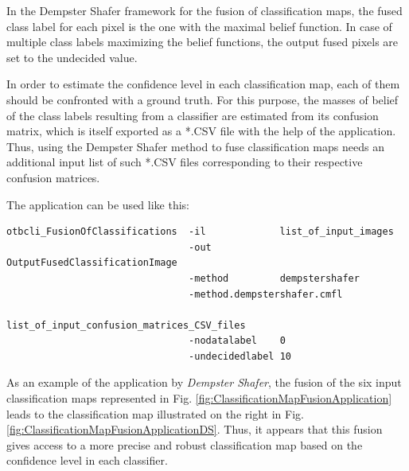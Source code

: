 In the Dempster Shafer framework for the fusion of classification maps, the fused 
class label for each pixel is the one with the maximal belief function. In case of 
multiple class labels maximizing the belief functions, the output fused pixels are 
set to the undecided value.

In order to estimate the confidence level in each classification map, each of them 
should be confronted with a ground truth. For this purpose, the masses of belief of 
the class labels resulting from a classifier are estimated from its confusion 
matrix, which is itself exported as a *.CSV file with the help of the 
 application. Thus, using the Dempster Shafer 
method to fuse classification maps needs an additional input list of such *.CSV files 
corresponding to their respective confusion matrices.

The application can be used like this:
\begin{verbatim}
otbcli_FusionOfClassifications  -il             list_of_input_images
                                -out            OutputFusedClassificationImage
                                -method         dempstershafer
                                -method.dempstershafer.cmfl 
                                    list_of_input_confusion_matrices_CSV_files
                                -nodatalabel    0
                                -undecidedlabel 10
\end{verbatim}



As an example of the  application by 
\emph{Dempster Shafer}, the fusion of the six input classification maps 
represented in Fig. \ref{fig:ClassificationMapFusionApplication} leads to the 
classification map illustrated on the right in Fig. \ref{fig:ClassificationMapFusionApplicationDS}. 
Thus, it appears that this fusion gives access to a more precise and robust 
classification map based on the confidence level in each classifier.


